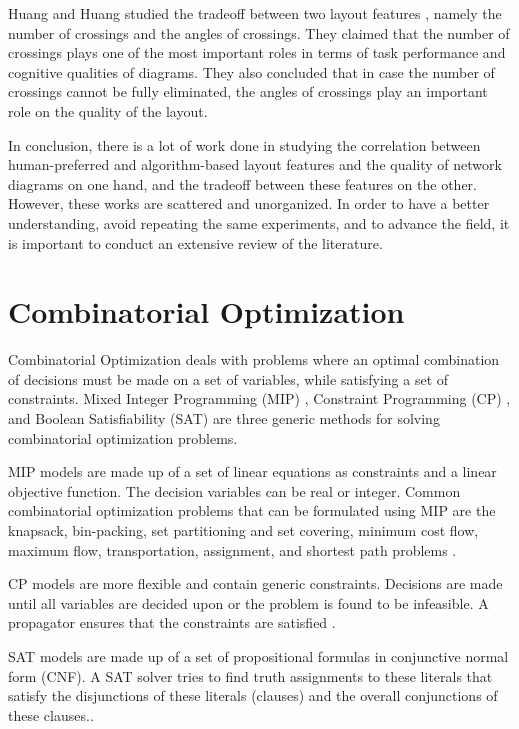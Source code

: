 \documentclass[a4paper,11pt,phdthesis,singlespace,twoside]{cssethesis}
\begin{document}
Huang and Huang studied the tradeoff between two layout features \cite{huang2010exploring}, namely the number of crossings and the angles of crossings. They claimed that the number of crossings plays one of the most important roles in terms of task performance and cognitive qualities of diagrams. They also concluded that in case the number of crossings cannot be fully eliminated, the angles of crossings play an important role on the quality of the layout.

In conclusion, there is a lot of work done in studying the correlation between human-preferred and algorithm-based layout features and the quality of network diagrams on one hand, and the tradeoff between these features on the other. However, these works are scattered and unorganized. In order to have a better understanding, avoid repeating the same experiments, and to advance the field, it is important to conduct an extensive review of the literature.

\section{Combinatorial Optimization} \label{com}

Combinatorial Optimization deals with problems where an optimal combination of decisions must be made on a set of variables, while satisfying a set of constraints. Mixed Integer Programming (MIP) \cite{MILPcom}, Constraint Programming (CP) \cite{CPcom}, and Boolean Satisfiability (SAT) \cite{codish2008logic} are three generic methods for solving combinatorial optimization problems. 

MIP models are made up of a set of linear equations as constraints and a linear objective function. The decision variables can be real or integer. Common combinatorial optimization problems that can be formulated using MIP are the knapsack, bin-packing, set partitioning and set covering, minimum cost flow, maximum flow, transportation, assignment, and shortest path problems \cite{MILPcom}.

CP models are more flexible and contain generic constraints. Decisions are made until all variables are decided upon or the problem is found to be infeasible. A propagator ensures that the constraints are satisfied \cite{CPcom}.

SAT models are made up of a set of propositional formulas in conjunctive normal form (CNF). A SAT solver tries to find truth assignments to these literals that satisfy the disjunctions of these literals (clauses) and the overall conjunctions of these clauses.\cite{codish2008logic}.
\end{document}
